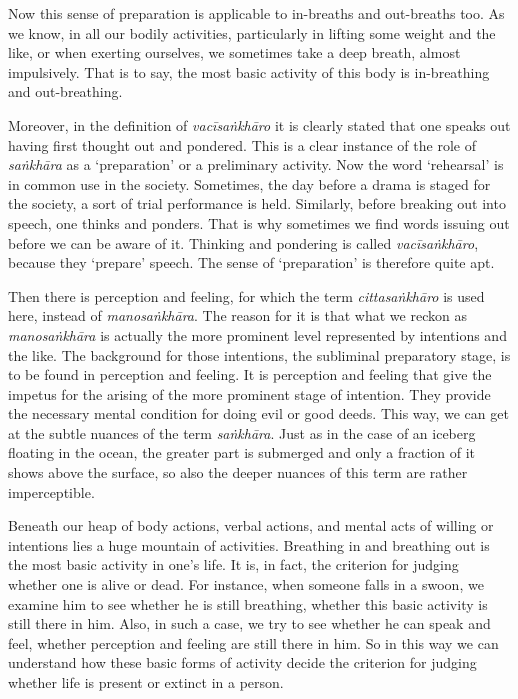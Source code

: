 Now this sense of preparation is applicable to in-breaths and out-breaths too. As we know, in all our bodily activities, particularly in lifting some weight and the like, or when exerting ourselves, we sometimes take a deep breath, almost impulsively. That is to say, the most basic activity of this body is in-breathing and out-breathing.

Moreover, in the definition of \emph{vacīsaṅkhāro} it is clearly stated that one speaks out having first thought out and pondered. This is a clear instance of the role of \emph{saṅkhāra} as a `preparation' or a preliminary activity. Now the word `rehearsal' is in common use in the society. Sometimes, the day before a drama is staged for the society, a sort of trial performance is held. Similarly, before breaking out into speech, one thinks and ponders. That is why sometimes we find words issuing out before we can be aware of it. Thinking and pondering is called \emph{vacīsaṅkhāro}, because they `prepare' speech. The sense of `preparation' is therefore quite apt.

Then there is perception and feeling, for which the term \emph{cittasaṅkhāro} is used here, instead of \emph{manosaṅkhāra}. The reason for it is that what we reckon as \emph{manosaṅkhāra} is actually the more prominent level represented by intentions and the like. The background for those intentions, the subliminal preparatory stage, is to be found in perception and feeling. It is perception and feeling that give the impetus for the arising of the more prominent stage of intention. They provide the necessary mental condition for doing evil or good deeds. This way, we can get at the subtle nuances of the term \emph{saṅkhāra}. Just as in the case of an iceberg floating in the ocean, the greater part is submerged and only a fraction of it shows above the surface, so also the deeper nuances of this term are rather imperceptible.

Beneath our heap of body actions, verbal actions, and mental acts of willing or intentions lies a huge mountain of activities. Breathing in and breathing out is the most basic activity in one's life. It is, in fact, the criterion for judging whether one is alive or dead. For instance, when someone falls in a swoon, we examine him to see whether he is still breathing, whether this basic activity is still there in him. Also, in such a case, we try to see whether he can speak and feel, whether perception and feeling are still there in him. So in this way we can understand how these basic forms of activity decide the criterion for judging whether life is present or extinct in a person.

